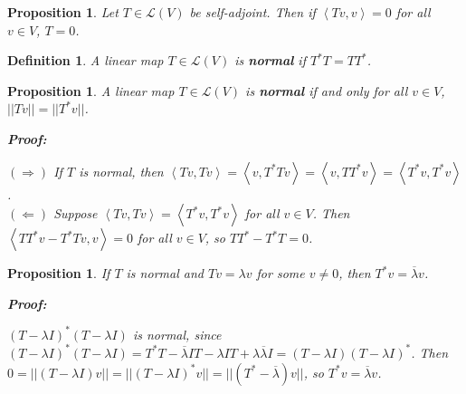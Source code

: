 \documentclass{article}
\theoremstyle{colontheorem}
\newtheorem{proposition}[theorem]{Proposition}
\newtheorem{definition}[theorem]{Definition}
\newenvironment{Proposition}
{
	\begin{mdframed}[backgroundcolor=TheoremOrange!10]
	\begin{proposition}
}
{
	\end{proposition}
	\end{mdframed}
	
	\vspace{.15in}
}
\newenvironment{Def}
{
	\begin{mdframed}[backgroundcolor=DefGreen!10]
	\begin{definition}
}
{
	\end{definition}
	\end{mdframed}
	
	\vspace{.15in}
}
\newenvironment{Proof}
{
	\begin{mdframed}[backgroundcolor=ProofPurple!10]
	\textbf{Proof:}%
}
{
	\end{mdframed}
	
	\vspace{.085in}
}
\begin{document}
\begin{Proposition}
	
	Let $T \in \mathcal{L}(V)$ be self-adjoint. Then if $\left< Tv, v \right> = 0$ for all $v \in V$, $T = 0$.
	
\end{Proposition}



\begin{Def}
	
	A linear map $T \in \mathcal{L}(V)$ is \textbf{normal} if $T^* T = TT^*$.
	
\end{Def}



\begin{Proposition}
	
	A linear map $T \in \mathcal{L}(V)$ is \textbf{normal} if and only for all $v \in V$, $||Tv|| = ||T^* v||$.
	
	\begin{Proof}
		$(\Rightarrow)$ If $T$ is normal, then $\left< Tv, Tv \right> = \left< v, T^* T v \right> = \left< v, T T^* v \right> = \left< T^* v, T^* v \right>$.\\
		
		$(\Leftarrow)$ Suppose $\left< Tv, Tv \right> = \left< T^* v, T^* v \right>$ for all $v \in V$. Then $\left< TT^* v - T^* T v, v \right> = 0$ for all $v \in V$, so $TT^* - T^* T = 0$.
		
	\end{Proof}
	
\end{Proposition}



\begin{Proposition}
	
	If $T$ is normal and $Tv = \lambda v$ for some $v \neq 0$, then $T^* v = \overline{\lambda} v$.
	
	\begin{Proof}
		$(T- \lambda I)^* (T - \lambda I)$ is normal, since $(T- \lambda I)^* (T - \lambda I) = T^* T - \overline{\lambda} IT - \lambda IT + \lambda \overline{\lambda} I = (T- \lambda I)(T - \lambda I)^*$. Then $0 = ||(T - \lambda I)v|| = ||(T - \lambda I)^* v|| = ||(T^* - \overline{\lambda})v||$, so $T^* v = \overline{\lambda} v$.
		
	\end{Proof}
	
\end{Proposition}
\end{document}
